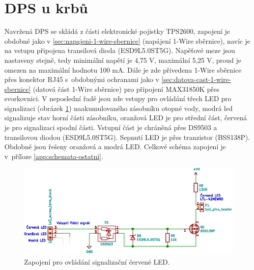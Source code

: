 \section{DPS u krbů}
\label{sec:dps-u-krbu}
Navržená DPS se skládá z části elektronické pojistky TPS2600, zapojení je obdobné jako v \ref{sec:napajeni-1-wire-sbernice} (napájení 1-Wire sběrnice), navíc je na vstupu připojena transilová dioda (ESD9L5.0ST5G). Napěťové meze jsou nastaveny stejně, tedy minimální napětí je 4,75 V, maximální 5,25 V, proud je omezen na maximální hodnotu 100 mA. Dále je zde přivedena 1-Wire sběrnice přes konektor RJ45 s~obdobnými ochranami jako v \ref{sec:datova-cast-1-wire-sbernice} (datová část 1-Wire sběrnice) pro připojení MAX31850K přes svorkovnici. V neposlední řadě jsou zde vstupy pro ovládání třech LED pro signalizaci (obrázek \ref{fig:led-indikace}) naakumulovaného zásobníku otopné vody, modrá led signalizuje stav horní části zásobníku, oranžová LED je pro střední část, červená je pro signalizaci spodní části. Vstupní část je chráněná přes DS9503 a transilovou diodou (ESD9L5.0ST5G). Sepnutí LED je přes tranzistor (BSS138P). Obdobně jsou řešeny oranžová a modrá LED. Celkové schéma zapojení je v~příloze \ref{app:schemata-ostatni}.

\begin{figure}[H]
    \centering
    \includegraphics[width=\textwidth]{images/svg/kicad/led-indikace.eps}
    \caption{Zapojení pro ovládání signalizační červené LED.}
    \label{fig:led-indikace}
\end{figure}

